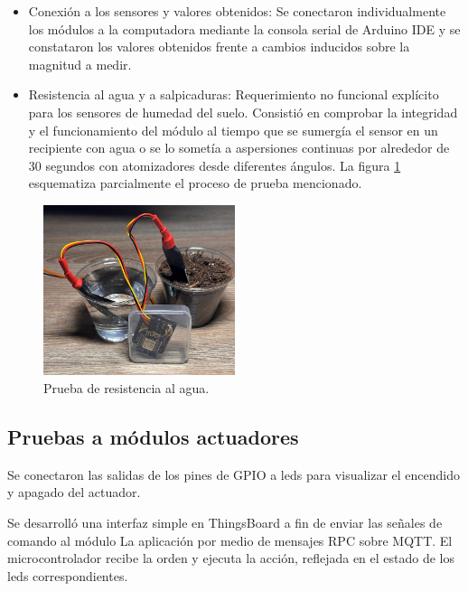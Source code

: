 \begin{itemize}
\item Conexión a los sensores y valores obtenidos: Se conectaron individualmente los módulos a la computadora mediante la consola serial de Arduino IDE y se constataron los valores obtenidos frente a cambios inducidos sobre la magnitud a medir.

\item Resistencia al agua y a salpicaduras: Requerimiento no funcional explícito para los sensores de humedad del suelo. Consistió en comprobar la integridad y el funcionamiento del módulo al tiempo que se sumergía el sensor en un recipiente con agua o se lo sometía a aspersiones continuas por alrededor de 30 segundos con atomizadores desde diferentes ángulos.
La figura \ref{fig:soil_test} esquematiza parcialmente el proceso de prueba mencionado.

  
\end{itemize}


\begin{figure}[h]
	\centering
	\includegraphics[width=0.50\textwidth]{./Figures/chapter4/soil_testing3.jpg}
	\caption[Prueba de resistencia al agua]{Prueba de resistencia al agua.}
	\label{fig:soil_test}
\end{figure}

\subsection{Pruebas a módulos actuadores}
\label{sec:Pruebas a módulos actuadores}

Se conectaron las salidas de los pines de GPIO a leds para visualizar el encendido y apagado del actuador. 

Se desarrolló una interfaz simple en ThingsBoard a fin de enviar las señales de comando al módulo La aplicación por medio de mensajes RPC sobre MQTT. El microcontrolador recibe la orden y ejecuta la acción, reflejada en el estado de los leds correspondientes.



